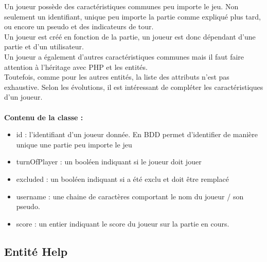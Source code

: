 \documentclass{article}
\begin{document}
                Un joueur possède des caractéristiques communes peu importe le jeu. Non seulement un identifiant, unique peu importe la partie comme expliqué plus tard, ou encore un pseudo et des indicateurs de tour.\\
                \indent Un joueur est créé en fonction de la partie, un joueur est donc dépendant d'une partie et d'un utilisateur.\\
                \indent Un joueur a également d'autres caractéristiques communes mais il faut faire attention à l'héritage avec PHP et les entités.\\
                \indent Toutefois, comme pour les autres entités, la liste des attributs n'est pas exhaustive. Selon les évolutions, il est intéressant de compléter les caractéristiques d'un joueur.\\
                \\
                \textbf{Contenu de la classe :}
                \begin{itemize}
                    \item id : l'identifiant d'un joueur donnée. En BDD permet d'identifier de manière unique une partie peu importe le jeu
                    \item turnOfPlayer : un booléen indiquant si le joueur doit jouer
                    \item excluded : un booléen indiquant si a été exclu et doit être remplacé
                    \item username : une chaine de caractères comportant le nom du joueur / son pseudo.
                    \item score : un entier indiquant le score du joueur sur la partie en cours.
                \end{itemize}

        \subsection{Entité Help}
\end{document}
